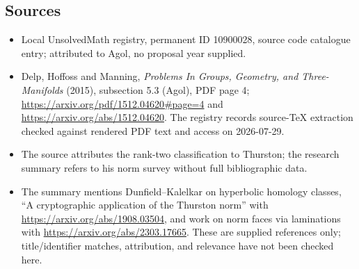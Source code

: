 \documentclass[11pt]{article}
\begin{document}
\subsection{Sources}
\begin{itemize}
\item Local UnsolvedMath registry, permanent ID 10900028, source code catalogue entry; attributed to Agol, no proposal year supplied.
\item Delp, Hoffoss and Manning, \emph{Problems In Groups, Geometry, and Three-Manifolds} (2015), subsection 5.3 (Agol), PDF page 4; \url{https://arxiv.org/pdf/1512.04620#page=4} and \url{https://arxiv.org/abs/1512.04620}. The registry records source-TeX extraction checked against rendered PDF text and access on 2026-07-29.
\item The source attributes the rank-two classification to Thurston; the research summary refers to his norm survey without full bibliographic data.
\item The summary mentions Dunfield--Kalelkar on hyperbolic homology classes, ``A cryptographic application of the Thurston norm'' with \url{https://arxiv.org/abs/1908.03504}, and work on norm faces via laminations with \url{https://arxiv.org/abs/2303.17665}. These are supplied references only; title/identifier matches, attribution, and relevance have not been checked here.
\end{itemize}
\end{document}
